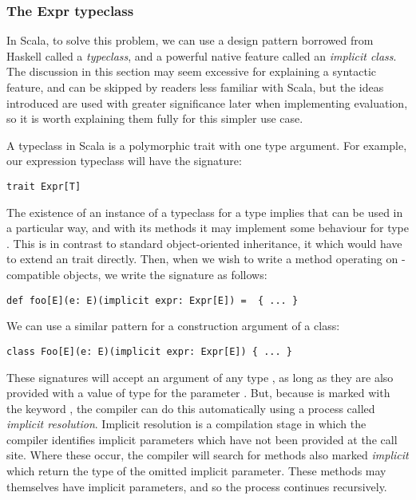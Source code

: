 \subsubsection{The Expr typeclass} \label{exprtypeclass}
In Scala, to solve this problem, we can use a design pattern borrowed from Haskell called a \textit{typeclass}, and a powerful native feature called an \textit{implicit class}. The discussion in this section may seem excessive for explaining a syntactic feature, and can be skipped by readers less familiar with Scala, but the ideas introduced are used with greater significance later when implementing evaluation, so it is worth explaining them fully for this simpler use case.

A typeclass in Scala is a polymorphic trait with one type argument. For example, our expression typeclass will have the signature:
\vs \begin{lstlisting}
trait Expr[T]
\end{lstlisting} \vs
The existence of an instance of a typeclass for a type  implies that  can be used in a particular way, and with its methods it may implement some behaviour for type . This is in contrast to standard object-oriented inheritance, it which  would have to extend an  trait directly. Then, when we wish to write a method operating on -compatible objects, we write the signature as follows:
\vs \begin{lstlisting}
def foo[E](e: E)(implicit expr: Expr[E]) =  { ... }
\end{lstlisting} \vs
We can use a similar pattern for a construction argument of a class:
\vs \begin{lstlisting}
class Foo[E](e: E)(implicit expr: Expr[E]) { ... }
\end{lstlisting} \vs

These signatures will accept an argument of any type , as long as they are also provided with a value of type  for the parameter . But, because  is marked with the keyword , the compiler can do this automatically using a process called \textit{implicit resolution}. Implicit resolution is a compilation stage in which the compiler identifies implicit parameters which have not been provided at the call site. Where these occur, the compiler will search for methods also marked \textit{implicit} which return the type of the omitted implicit parameter. These methods may themselves have implicit parameters, and so the process continues recursively.

